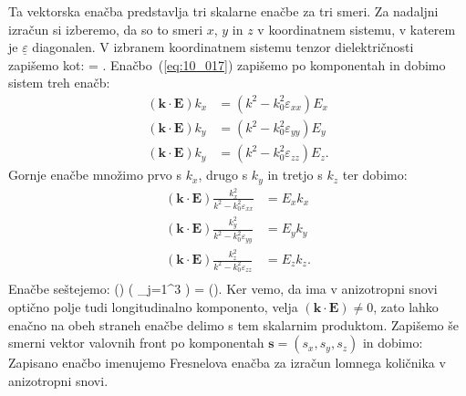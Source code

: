 Ta vektorska enačba predstavlja tri skalarne enačbe za tri smeri. Za nadaljni izračun si izberemo,
da so to smeri $x$, $y$ in $z$ v koordinatnem sistemu, v katerem je $\underline{\varepsilon}$ diagonalen.
V izbranem koordinatnem sistemu tenzor dielektričnosti zapišemo kot:
\beq
\underline{\varepsilon} = 
\!\!.
\label{eq:10_018}
\eeq
Enačbo~(\ref{eq:10_017}) zapišemo po komponentah in dobimo sistem treh enačb:
\begin{align}
\left(\mathbf{k}\cdot \mathbf{E}\right) k_x &= \left( k^2 -k_0^2 \varepsilon_{xx}\right) E_x \\
\left(\mathbf{k}\cdot \mathbf{E}\right) k_y &= \left( k^2 -k_0^2 \varepsilon_{yy}\right) E_y \\
\left(\mathbf{k}\cdot \mathbf{E}\right) k_y &= \left( k^2 -k_0^2 \varepsilon_{zz}\right) E_z.
\label{eq:10_019}
\end{align}
Gornje enačbe množimo prvo s $k_x$, drugo s $k_y$ in tretjo s $k_z$ ter dobimo:
\begin{align}
\left(\mathbf{k}\cdot \mathbf{E}\right) 
\frac{k_x^2}{k^2 - k_0^2 \varepsilon_{xx}} &= E_x k_x \\
\left(\mathbf{k}\cdot \mathbf{E}\right) 
\frac{k_y^2}{k^2 - k_0^2 \varepsilon_{yy}} &= E_y k_y \\
\left(\mathbf{k}\cdot \mathbf{E}\right) 
\frac{k_z^2}{k^2 - k_0^2 \varepsilon_{zz}} &= E_z k_z. \\
\label{eq:10_020}
\end{align}
Enačbe seštejemo:
\beq
\left(\cdot {}\right)  
\left(
\sum_{j=1}^3 
\right) = \left(\cdot {}\right).
\label{eq:10_021}
\eeq
Ker vemo, da ima v anizotropni snovi optično polje tudi
longitudinalno komponento, velja 
$\left(\mathbf{k}\cdot \mathbf{E}\right) \neq 0$, zato lahko enačno
na obeh straneh enačbe delimo s tem skalarnim produktom. Zapišemo 
še smerni vektor valovnih front po komponentah $\mathbf{s} = (s_x, s_y, s_z)$
in dobimo:
Zapisano enačbo imenujemo Fresnelova enačba za izračun lomnega 
količnika v anizotropni snovi.

